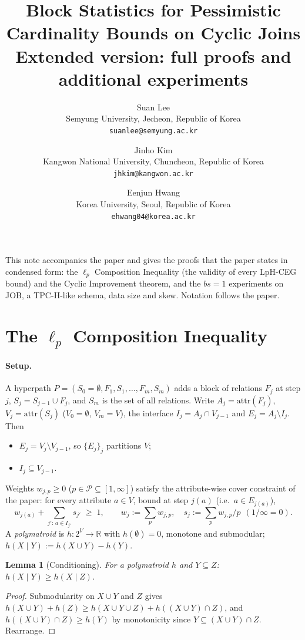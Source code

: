\documentclass[11pt]{article}
\title{Block Statistics for Pessimistic Cardinality Bounds on Cyclic Joins\\[4pt]
\large Extended version: full proofs and additional experiments}
\author{Suan Lee\\ Semyung University, Jecheon, Republic of Korea\\ \texttt{suanlee@semyung.ac.kr}
\and Jinho Kim\\ Kangwon National University, Chuncheon, Republic of Korea\\ \texttt{jhkim@kangwon.ac.kr}
\and Eenjun Hwang\\ Korea University, Seoul, Republic of Korea\\ \texttt{ehwang04@korea.ac.kr}}
\date{}
\newcommand{\block}{F}
\newcommand{\interface}{I}
\newcommand{\joinstate}{S}
\newcommand{\attr}[1]{\mathrm{attr}(#1)}
\newtheorem{lemma}{Lemma}
\begin{document}
\maketitle

\noindent This note accompanies the paper and gives the
proofs that the paper states in condensed form: the $\ell_p$ Composition
Inequality (the validity of every LpH-CEG bound) and the Cyclic
Improvement theorem, and the $bs=1$ experiments on JOB, a TPC-H-like
schema, data size and skew. Notation follows the paper.

\section{The $\ell_p$ Composition Inequality}

\paragraph{Setup.} A hyperpath $P=(\joinstate_0{=}\emptyset,\block_1,
\joinstate_1,\dots,\block_m,\joinstate_m)$ adds a block of relations
$\block_j$ at step $j$, $\joinstate_j=\joinstate_{j-1}\cup\block_j$, and
$\joinstate_m$ is the set of all relations. Write $A_j=\attr{\block_j}$,
$V_j=\attr{\joinstate_j}$ ($V_0=\emptyset$, $V_m=V$), the interface
$\interface_j=A_j\cap V_{j-1}$ and $E_j=A_j\setminus\interface_j$. Then
\begin{itemize}
\item[(F1)] $E_j=V_j\setminus V_{j-1}$, so $\{E_j\}_{j}$ partitions $V$;
\item[(F2)] $\interface_j\subseteq V_{j-1}$.
\end{itemize}
Weights $w_{j,p}\ge0$ ($p\in\mathcal{P}\subseteq[1,\infty]$) satisfy the
attribute-wise cover constraint of the paper: for every attribute $a\in V$,
bound at step $j(a)$ (i.e.\ $a\in E_{j(a)}$),
\begin{equation}\tag{C}
w_{j(a)}+\sum_{j':\,a\in\interface_{j'}}s_{j'}\;\ge\;1,
\qquad w_j:=\sum_p w_{j,p},\quad s_j:=\sum_p w_{j,p}/p\ \ (1/\infty=0).
\end{equation}
A \emph{polymatroid} is $h:2^V\to\mathbb{R}$ with $h(\emptyset)=0$,
monotone and submodular; $h(X\mid Y):=h(X\cup Y)-h(Y)$.

\begin{lemma}[Conditioning]\label{lem:cond}
For a polymatroid $h$ and $Y\subseteq Z$: $h(X\mid Y)\ge h(X\mid Z)$.
\end{lemma}
\begin{proof}
Submodularity on $X\cup Y$ and $Z$ gives $h(X\cup Y)+h(Z)\ge
h(X\cup Y\cup Z)+h((X\cup Y)\cap Z)$, and $h((X\cup Y)\cap Z)\ge h(Y)$ by
monotonicity since $Y\subseteq(X\cup Y)\cap Z$. Rearrange.
\end{proof}
\end{document}
